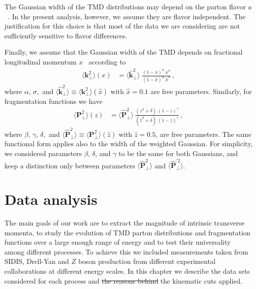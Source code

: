 \documentclass[aps,preprintnumbers,showpacs,nofootinbib,superscriptaddress,floatfix]{revtex4}
\newcommand{\AS}[1]{{\textcolor[rgb]{1,0,1}{#1}}}
\newcommand{\T}{\perp}
\begin{document}
The
Gaussian width of the TMD \AS{distributions} may depend 
on the parton flavor $a$~\cite{Signori:2013mda}. 
In the present analysis, however, we assume they are
flavor independent. The justification for this choice is that most of the data
we are considering are not sufficiently sensitive to flavor differences.

Finally, we assume \AS{that} the Gaussian width of the TMD depends on 
fractional longitudinal momentum $x$~\cite{Signori:2013mda} according to
\begin{align} 
\big\langle \bm{k}_{\T}^2 \big\rangle (x) &= \big\langle \hat{\bm{k}}_{\T}^2 \big\rangle \;  
\frac{(1-x)^{\alpha} \  x^{\sigma} }{ (1 - \hat{x})^{\alpha} \  \hat{x}^{\sigma} } \, ,
\label{e:kT2_kin}
\end{align}
where $\alpha, \, \sigma,$ and $\big\langle \hat{\bm{k}}_{\T}^2 \big\rangle
\equiv \big\langle \bm{k}_{\T}^2 \big\rangle (\hat{x})$ with $\hat{x} = 0.1$
are free parameters. Similarly, for fragmentation functions we have
\begin{align}  
\big\langle \bm{P}_{\T}^2 \big\rangle (z) &= \big\langle \hat{\bm{P}}_{\T}^2 \big\rangle \  
               \frac{ (z^{\beta} + \delta)\ (1-z)^{\gamma} }{ (\hat{z}^{\beta} + \delta)\   (1 - \hat{z})^{\gamma} } \, ,
 \label{e:PT2_kin}
 \end{align}
where $\beta, \, \gamma, \, \delta, $ and $\big\langle \hat{\bm{P}}_{\T}^2 \big\rangle \equiv \big \langle \bm{P}_{\T}^2 \big\rangle
(\hat{z})$ with $\hat{z} = 0.5$, are free parameters. The same functional form
applies also to the width of the weighted Gaussian. For simplicity, we
considered parameters $\beta$, $\delta$, and $\gamma$ to be the same for both
Gaussians, and keep a distinction only between parameters 
$\big\langle \hat{\bm{P}}_{\T}^2 \big\rangle$ and
$\big\langle \hat{\bm{P}}_{\T}^{\prime 2} \big\rangle$.
 

\section{Data analysis}
\label{s:data_analysis}


The main goals of our work are \AS{to extract the magnitude of intrinsic transverse momenta,} to study the evolution of TMD parton distributions and fragmentation functions over a large enough range of energy and to test their universality among different processes. To achieve this we included measurements taken from SIDIS, Drell-Yan and $Z$ boson production from different experimental collaborations at different energy scales.
In this chapter we describe the data sets considered for each process and \AS{\sout{the reasons behind}} the kinematic cuts applied.
\end{document}
